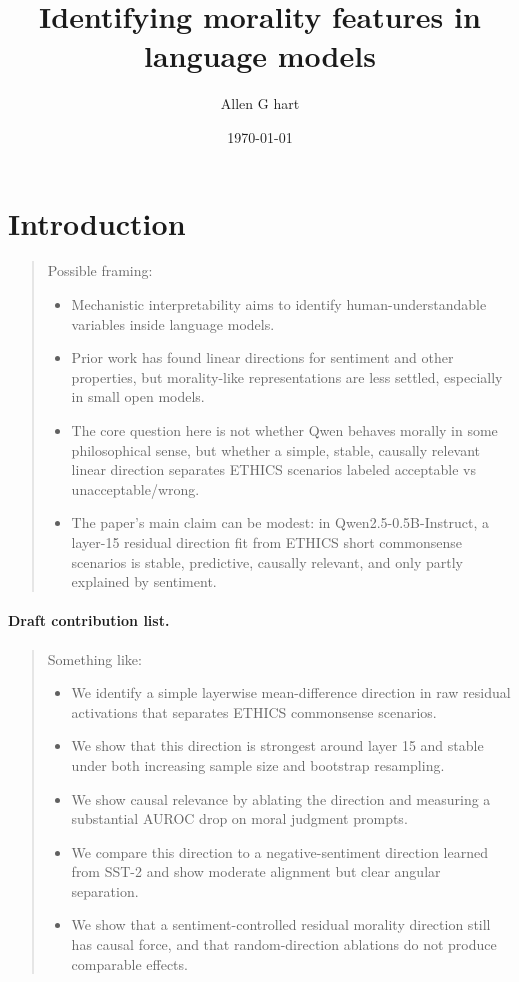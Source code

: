 \documentclass[11pt]{article}
\title{Identifying morality features in language models}
\author{Allen G hart}
\date{\today}
\newcommand{\draftnote}[1]{%
  \begin{quote}\footnotesize\color{gray}#1\end{quote}%
}
\begin{document}
\maketitle


\section{Introduction}
\draftnote{
Possible framing:
\begin{itemize}[leftmargin=1.5em]
    \item Mechanistic interpretability aims to identify human-understandable variables inside language models.
    \item Prior work has found linear directions for sentiment and other properties, but morality-like representations are less settled, especially in small open models.
    \item The core question here is not whether Qwen behaves morally in some philosophical sense, but whether a simple, stable, causally relevant linear direction separates ETHICS scenarios labeled acceptable vs unacceptable/wrong.
    \item The paper's main claim can be modest: in Qwen2.5-0.5B-Instruct, a layer-15 residual direction fit from ETHICS short commonsense scenarios is stable, predictive, causally relevant, and only partly explained by sentiment.
\end{itemize}
}

\paragraph{Draft contribution list.}
\draftnote{
Something like:
\begin{itemize}[leftmargin=1.5em]
    \item We identify a simple layerwise mean-difference direction in raw residual activations that separates ETHICS commonsense scenarios.
    \item We show that this direction is strongest around layer 15 and stable under both increasing sample size and bootstrap resampling.
    \item We show causal relevance by ablating the direction and measuring a substantial AUROC drop on moral judgment prompts.
    \item We compare this direction to a negative-sentiment direction learned from SST-2 and show moderate alignment but clear angular separation.
    \item We show that a sentiment-controlled residual morality direction still has causal force, and that random-direction ablations do not produce comparable effects.
\end{itemize}
}
\end{document}
